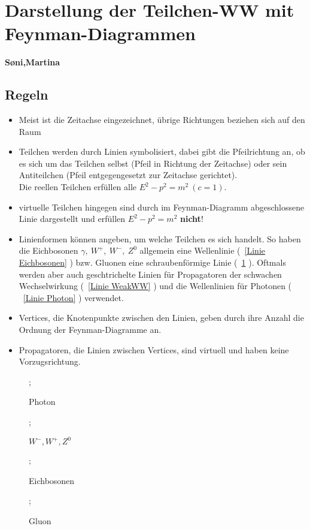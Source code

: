 \documentclass[Ex4_Zusammenfassung.tex]{subfiles}
\begin{document}
\section{Darstellung der Teilchen-WW mit Feynman-Diagrammen}
\textbf{S\o{}ni,Martina}
	\subsection*{Regeln}
	
	\begin{itemize}
		\item Meist ist die Zeitachse eingezeichnet, übrige Richtungen beziehen sich auf den Raum
		\item Teilchen werden durch Linien symbolisiert, dabei gibt die Pfeilrichtung an, ob es sich um das Teilchen selbst (Pfeil in Richtung der Zeitachse) oder sein Antiteilchen (Pfeil entgegengesetzt zur Zeitachse gerichtet).\\
		Die reellen Teilchen erfüllen alle $E^2 - p^2 = m^2\ (c=1)$.
		\item virtuelle Teilchen hingegen sind durch im Feynman-Diagramm abgeschlossene Linie dargestellt und erfüllen $E^2 - p^2 = m^2$ \textbf{nicht}!
		\item Linienformen können angeben, um welche Teilchen es sich handelt. So haben die Eichbosonen $\gamma,\ W^+,\ W^-,\ Z^0$ allgemein eine Wellenlinie (~\ref{Linie Eichbosonen} ) bzw. Gluonen eine schraubenförmige Linie (~\ref{Linie Gluon} ). Oftmals werden aber auch geschtrichelte Linien für Propagatoren der schwachen Wechselwirkung (~\ref{Linie WeakWW} ) und die Wellenlinien für Photonen ( ~\ref{Linie Photon} ) verwendet.
		\item Vertices, die Knotenpunkte zwischen den Linien, geben durch ihre Anzahl die Ordnung der Feynman-Diagramme an.
		\item Propagatoren, die Linien zwischen Vertices, sind virtuell und haben keine Vorzugsrichtung.
	\end{itemize}
	
	\begin{figure}[h]
		\centering
		;
		\caption{Photon}
		\label{Linie Photon}

		;
		\caption{$W^-,W^+,Z^0$}
		\label{Linie WeakWW} 
		
		;
				\caption{Eichbosonen}
				\label{Linie Eichbosonen}
		
		;
		\caption{Gluon}
		\label{Linie Gluon}
	\end{figure}
	
\end{document}
